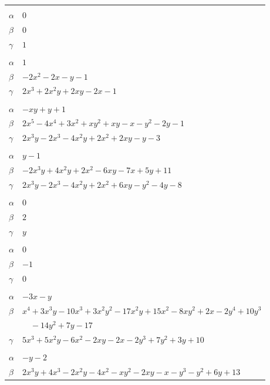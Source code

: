 \documentclass[11pt]{article}
\begin{document}
\begin{longtable}{@{}ll@{}}
\addlinespace[3pt]
\multicolumn{2}{@{}l}{$\{i,j\}=\{37,202\}$, $k_{ij}=3$}\\
$\alpha$ & $0$\\
$\beta$ & $0$\\
$\gamma$ & $1$\\
\addlinespace[3pt]
\multicolumn{2}{@{}l}{$\{i,j\}=\{38,58\}$, $k_{ij}=2$}\\
$\alpha$ & $1$\\
$\beta$ & $-2x^{2}-2x-y-1$\\
$\gamma$ & $2x^{3}+2x^{2}y+2xy-2x-1$\\
\addlinespace[3pt]
\multicolumn{2}{@{}l}{$\{i,j\}=\{38,155\}$, $k_{ij}=2$}\\
$\alpha$ & $-xy+y+1$\\
$\beta$ & $2x^{5}-4x^{4}+3x^{2}+xy^{2}+xy-x-y^{2}-2y-1$\\
$\gamma$ & $2x^{3}y-2x^{3}-4x^{2}y+2x^{2}+2xy-y-3$\\
\addlinespace[3pt]
\multicolumn{2}{@{}l}{$\{i,j\}=\{38,180\}$, $k_{ij}=2^{4}$}\\
$\alpha$ & $y-1$\\
$\beta$ & $-2x^{3}y+4x^{2}y+2x^{2}-6xy-7x+5y+11$\\
$\gamma$ & $2x^{3}y-2x^{3}-4x^{2}y+2x^{2}+6xy-y^{2}-4y-8$\\
\addlinespace[3pt]
\multicolumn{2}{@{}l}{$\{i,j\}=\{38,208\}$, $k_{ij}=2$}\\
$\alpha$ & $0$\\
$\beta$ & $2$\\
$\gamma$ & $y$\\
\addlinespace[3pt]
\multicolumn{2}{@{}l}{$\{i,j\}=\{39,68\}$, $k_{ij}=1$}\\
$\alpha$ & $0$\\
$\beta$ & $-1$\\
$\gamma$ & $0$\\
\addlinespace[3pt]
\multicolumn{2}{@{}l}{$\{i,j\}=\{40,72\}$, $k_{ij}=13$}\\
$\alpha$ & $-3x-y$\\
$\beta$ & $x^{4}+3x^{3}y-10x^{3}+3x^{2}y^{2}-17x^{2}y+15x^{2}-8xy^{2}+2x-2y^{4}+10y^{3}$\\
 & $\quad -14y^{2}+7y-17$\\
$\gamma$ & $5x^{3}+5x^{2}y-6x^{2}-2xy-2x-2y^{3}+7y^{2}+3y+10$\\
\addlinespace[3pt]
\multicolumn{2}{@{}l}{$\{i,j\}=\{41,42\}$, $k_{ij}=2^{2}\cdot 3$}\\
$\alpha$ & $-y-2$\\
$\beta$ & $2x^{3}y+4x^{3}-2x^{2}y-4x^{2}-xy^{2}-2xy-x-y^{3}-y^{2}+6y+13$\\

\end{longtable}
\end{document}
